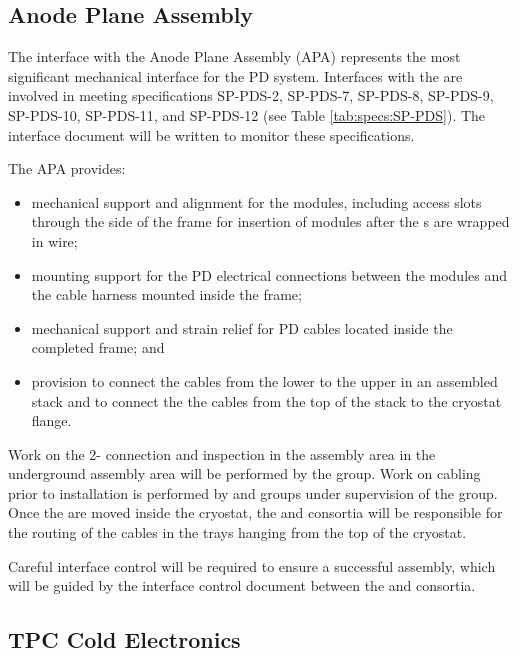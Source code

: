 \subsection{Anode Plane Assembly}

The interface with the Anode Plane Assembly (APA) represents the most significant mechanical interface for the PD system. Interfaces with the  are involved in meeting specifications SP-PDS-2, SP-PDS-7, SP-PDS-8, SP-PDS-9, SP-PDS-10, SP-PDS-11, and SP-PDS-12 (see Table \ref{tab:specs:SP-PDS}).  The interface document will be written to monitor these specifications.

The APA provides:
\begin{itemize}
\item mechanical support and alignment for the  modules, including access slots through the side of the frame for insertion of modules after the s are wrapped in wire;
\item mounting support for the PD electrical connections between the  modules and the cable harness mounted inside the  frame;
\item mechanical support and strain relief for PD cables located inside the completed  frame; and
\item provision to connect the  cables from the lower  to the upper  in an assembled  stack and to connect the the 
cables from the top of the  stack to the cryostat flange.
\end{itemize}

Work on the 2- connection and inspection in the assembly area in the underground assembly area will be performed by the  group. Work on cabling prior to installation is performed by  and  groups under supervision of the  group. Once the  are moved inside the cryostat, the  and  consortia will be responsible for the routing of the cables in the trays hanging from the top of the cryostat. 

Careful interface control will be required to ensure a successful assembly, which will be guided by the interface control document between the  and  consortia.  

\subsection{TPC Cold Electronics}
\label{sec:fdsp-pd-intfc-ce}

